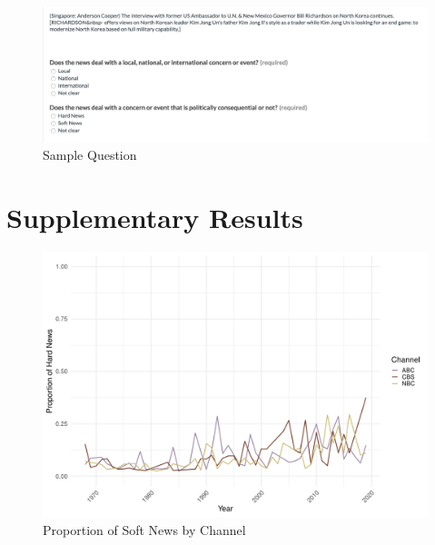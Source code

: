 \documentclass[12pt, letterpaper]{article}
\begin{document}
\begin{figure}[H]
  \centering
  \caption{Sample Question}
  \label{fig:test}
  \includegraphics[width=\linewidth]{../data/screenshots/sample_question.png}
\end{figure}

\clearpage
\section{Supplementary Results}

\begin{figure}[H]
    \centering
    \caption{Proportion of Soft News by Channel}
    \label{fig:soft_over_time_by_channel}
    \includegraphics[width=.95\linewidth]{../figs/fig_prob_soft_channel.pdf}
\end{figure}


\end{document}

